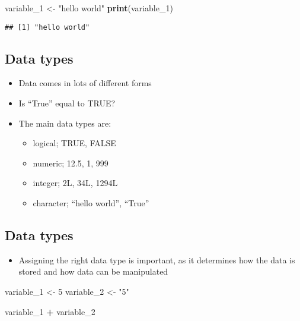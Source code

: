 \documentclass[]{article}
\newenvironment{Shaded}{\begin{snugshade}}{\end{snugshade}}
\newcommand{\KeywordTok}[1]{\textcolor[rgb]{0.13,0.29,0.53}{\textbf{#1}}}
\newcommand{\DecValTok}[1]{\textcolor[rgb]{0.00,0.00,0.81}{#1}}
\newcommand{\StringTok}[1]{\textcolor[rgb]{0.31,0.60,0.02}{#1}}
\newcommand{\OperatorTok}[1]{\textcolor[rgb]{0.81,0.36,0.00}{\textbf{#1}}}
\newcommand{\NormalTok}[1]{#1}
\providecommand{\tightlist}{%
  \setlength{\itemsep}{0pt}\setlength{\parskip}{0pt}}
\begin{document}
\begin{Shaded}
\begin{Highlighting}[]
\NormalTok{variable_}\DecValTok{1}\NormalTok{ <-}\StringTok{ "hello world"}
\KeywordTok{print}\NormalTok{(variable_}\DecValTok{1}\NormalTok{)}
\end{Highlighting}
\end{Shaded}

\begin{verbatim}
## [1] "hello world"
\end{verbatim}

\subsection{Data types}\label{data-types}

\begin{itemize}
\tightlist
\item
  Data comes in lots of different forms
\item
  Is ``True'' equal to TRUE?
\item
  The main data types are:

  \begin{itemize}
  \tightlist
  \item
    logical; TRUE, FALSE
  \item
    numeric; 12.5, 1, 999
  \item
    integer; 2L, 34L, 1294L
  \item
    character; ``hello world'', ``True''
  \end{itemize}
\end{itemize}

\subsection{Data types}\label{data-types-1}

\begin{itemize}
\tightlist
\item
  Assigning the right data type is important, as it determines how the
  data is stored and how data can be manipulated
\end{itemize}

\begin{Shaded}
\begin{Highlighting}[]
\NormalTok{variable_}\DecValTok{1}\NormalTok{ <-}\StringTok{ }\DecValTok{5}
\NormalTok{variable_}\DecValTok{2}\NormalTok{ <-}\StringTok{ "5"}

\NormalTok{variable_}\DecValTok{1} \OperatorTok{+}\StringTok{ }\NormalTok{variable_}\DecValTok{2}
\end{Highlighting}
\end{Shaded}
\end{document}

